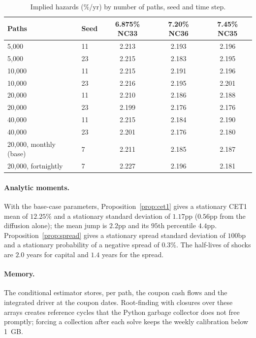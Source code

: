 \begin{table}[H]
\centering
\begin{tabular}{llccc}
\toprule
Paths & Seed & 6.875\% NC33 & 7.20\% NC36 & 7.45\% NC35 \\
\midrule
5,000 & 11 & 2.213 & 2.193 & 2.196 \\
5,000 & 23 & 2.215 & 2.183 & 2.195 \\
10,000 & 11 & 2.215 & 2.191 & 2.196 \\
10,000 & 23 & 2.216 & 2.195 & 2.201 \\
20,000 & 11 & 2.210 & 2.186 & 2.188 \\
20,000 & 23 & 2.199 & 2.176 & 2.176 \\
40,000 & 11 & 2.215 & 2.184 & 2.190 \\
40,000 & 23 & 2.201 & 2.176 & 2.180 \\
\midrule
20,000, monthly (base) & 7 & 2.211 & 2.185 & 2.187 \\
20,000, fortnightly & 7 & 2.227 & 2.196 & 2.181 \\
\bottomrule
\end{tabular}
\caption{Implied hazards (\%/yr) by number of paths, seed and time step.}
\label{tab:conv}
\end{table}

\paragraph{Analytic moments.} With the base-case parameters,
Proposition~\ref{prop:cet1} gives a stationary CET1 mean of $12.25\%$ and a stationary
standard deviation of $1.17$pp ($0.56$pp from the diffusion alone); the mean jump is $2.2$pp
and its $95$th percentile $4.4$pp. Proposition~\ref{prop:spread} gives a stationary spread
standard deviation of $100$bp and a stationary probability of a negative spread of $0.3\%$.
The half-lives of shocks are $2.0$ years for capital and $1.4$ years for the spread.

\paragraph{Memory.} The conditional estimator stores, per path, the coupon cash flows and the
integrated driver at the coupon dates. Root-finding with closures over these arrays creates
reference cycles that the Python garbage collector does not free promptly; forcing a
collection after each solve keeps the weekly calibration below 1~GB.

